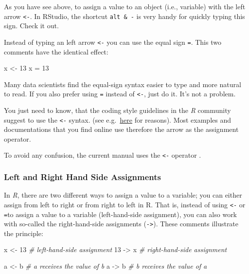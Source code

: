 \documentclass[
]{scrartcl}
\newenvironment{Shaded}{\begin{snugshade}}{\end{snugshade}}
\newcommand{\CommentTok}[1]{\textcolor[rgb]{0.56,0.35,0.01}{\textit{#1}}}
\newcommand{\DecValTok}[1]{\textcolor[rgb]{0.00,0.00,0.81}{#1}}
\newcommand{\NormalTok}[1]{#1}
\newcommand{\OtherTok}[1]{\textcolor[rgb]{0.56,0.35,0.01}{#1}}
\begin{document}
As you have see above, to assign a value to an object (i.e., variable) with the left arrow \texttt{\textless{}-}. In RStudio, the shortcut \texttt{alt\ \&\ -} is very handy for quickly typing this sign. Check it out.

Instead of typing an left arrow \texttt{\textless{}-} you can use the equal sign \texttt{=}. This two comments have the identical effect:

\begin{Shaded}
\begin{Highlighting}[]
\NormalTok{x }\OtherTok{\textless{}{-}} \DecValTok{13}
\NormalTok{x }\OtherTok{=} \DecValTok{13}
\end{Highlighting}
\end{Shaded}

Many data scientists find the equal-sign syntax easier to type and more natural to read. If you also prefer using \texttt{=} instead of \texttt{\textless{}-}, just do it. It's not a problem.

You just need to know, that the coding style guidelines in the \emph{R} community suggest to use the \texttt{\textless{}-} syntax. (see e.g.~\href{https://www.r-bloggers.com/why-do-we-use-arrow-as-an-assignment-operator/}{here} for reasons). Most examples and documentations that you find online use therefore the arrow as the assignment operator.

To avoid any confusion, the current manual uses the \texttt{\textless{}-} operator .

\subsubsection{Left and Right Hand Side Assignments}\label{left-and-right-hand-side-assignments}

In \emph{R}, there are two different ways to assign a value to a variable; you can either assign from left to right or from right to left in R. That is, instead of using \texttt{\textless{}-} or \texttt{=}to assign a value to a variable (left-hand-side assignment), you can also work with so-called the right-hand-side assignments (\texttt{-\textgreater{}}). These comments illustrate the principle:

\begin{Shaded}
\begin{Highlighting}[]
\NormalTok{x }\OtherTok{\textless{}{-}} \DecValTok{13}       \CommentTok{\# left{-}hand{-}side assignment}
\DecValTok{13} \OtherTok{{-}\textgreater{}}\NormalTok{ x       }\CommentTok{\# right{-}hand{-}side assignment}

\NormalTok{a }\OtherTok{\textless{}{-}}\NormalTok{ b        }\CommentTok{\# a receives the value of b}
\NormalTok{a }\OtherTok{{-}\textgreater{}}\NormalTok{ b        }\CommentTok{\# b receives the value of a}
\end{Highlighting}
\end{Shaded}
\end{document}

